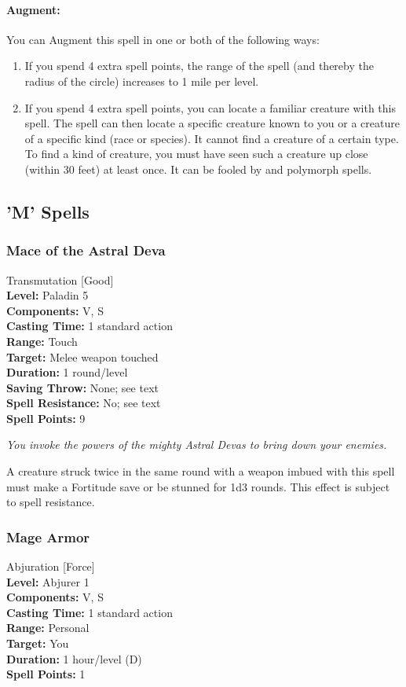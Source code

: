 \paragraph{Augment:} You can Augment this spell in one or both of the following ways:
\begin{enumerate}
 \item If you spend 4 extra spell points, the range of the spell (and thereby the radius of the circle) increases to 1 mile per level.
 \item If you spend 4 extra spell points, you can locate a familiar creature with this spell. 
 The spell can then locate a specific creature known to you or a creature of a specific kind (race or species). 
 It cannot find a creature of a certain type. 
 To find a kind of creature, you must have seen such a creature up close (within 30 feet) at least once.
 It can be fooled by  and polymorph spells.
\end{enumerate}
\subsection{'M' Spells}
\subsubsection{Mace of the Astral Deva}
\label{Spell:MaceOfTheAstralDeva}
Transmutation [Good]
\\ \textbf{Level:} Paladin 5
\\ \textbf{Components:} V, S
\\ \textbf{Casting Time:} 1 standard action
\\ \textbf{Range:} Touch
\\ \textbf{Target:} Melee weapon touched
\\ \textbf{Duration:} 1 round/level
\\ \textbf{Saving Throw:} None; see text
\\ \textbf{Spell Resistance:} No; see text
\\ \textbf{Spell Points:} 9

\emph{You invoke the powers of the mighty Astral Devas to bring down your enemies.}

A creature struck twice in the same round with a weapon imbued with this spell must make a Fortitude save or be stunned for 1d3 rounds.
This effect is subject to spell resistance.
\subsubsection{Mage Armor}
\label{Spell:MageArmor}
Abjuration [Force]
\\ \textbf{Level:} Abjurer 1
\\ \textbf{Components:} V, S
\\ \textbf{Casting Time:} 1 standard action
\\ \textbf{Range:} Personal
\\ \textbf{Target:} You
\\ \textbf{Duration:} 1 hour/level (D)
\\ \textbf{Spell Points:} 1

